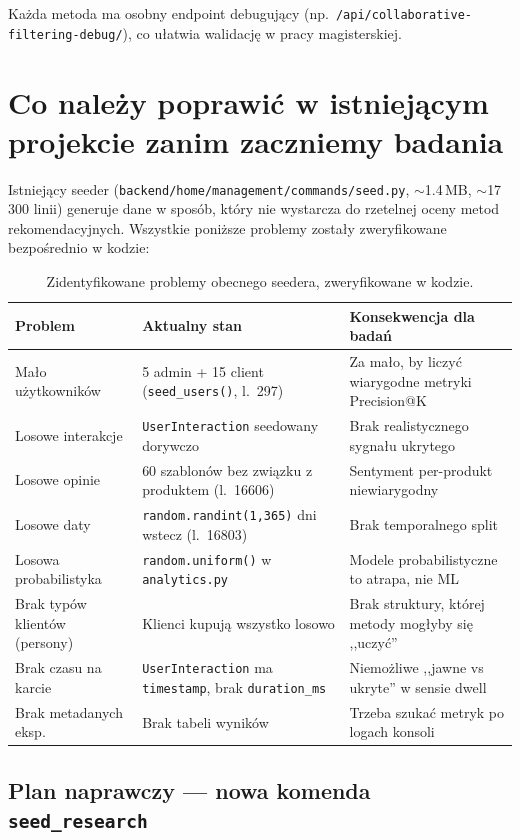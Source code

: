 \documentclass[a4paper,11pt]{article}
\newcommand{\code}[1]{\texttt{\small #1}}
\begin{document}
Każda metoda ma osobny endpoint debugujący (np.\ \code{/api/collaborative-filtering-debug/}), co ułatwia walidację w pracy magisterskiej.

\section{Co należy poprawić w istniejącym projekcie zanim zaczniemy badania}

Istniejący seeder (\code{backend/home/management/commands/seed.py}, $\sim$1.4\,MB, $\sim$17\,300 linii) generuje dane w sposób, który nie wystarcza do rzetelnej oceny metod rekomendacyjnych. Wszystkie poniższe problemy zostały zweryfikowane bezpośrednio w kodzie:

\begin{table}[H]
\centering
\footnotesize
\begin{tabularx}{\textwidth}{Y Y Y}
\toprule
\textbf{Problem} & \textbf{Aktualny stan} & \textbf{Konsekwencja dla badań} \\
\midrule
Mało użytkowników & 5 admin + 15 client (\code{seed\_users()}, l.~297) & Za mało, by liczyć wiarygodne metryki Precision@K \\
Losowe interakcje & \code{UserInteraction} seedowany dorywczo & Brak realistycznego sygnału ukrytego \\
Losowe opinie & 60 szablonów bez związku z produktem (l.~16606) & Sentyment per-produkt niewiarygodny \\
Losowe daty & \code{random.randint(1,365)} dni wstecz (l.~16803) & Brak temporalnego split \\
Losowa probabilistyka & \code{random.uniform()} w \code{analytics.py} & Modele probabilistyczne to atrapa, nie ML \\
Brak typów klientów (persony) & Klienci kupują wszystko losowo & Brak struktury, której metody mogłyby się ,,uczyć'' \\
Brak czasu na karcie & \code{UserInteraction} ma \code{timestamp}, brak \code{duration\_ms} & Niemożliwe ,,jawne vs ukryte'' w sensie dwell \\
Brak metadanych eksp. & Brak tabeli wyników & Trzeba szukać metryk po logach konsoli \\
\bottomrule
\end{tabularx}
\caption{Zidentyfikowane problemy obecnego seedera, zweryfikowane w kodzie.}
\end{table}

\subsection{Plan naprawczy --- nowa komenda \texttt{seed\_research}}
\end{document}
